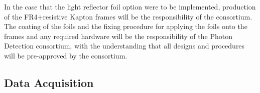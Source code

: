 In the case that the light reflector foil option were to be implemented, production of the FR4+resistive Kapton  frames will be the responsibility of the  consortium.
The  coating of the  foils and the fixing procedure for applying the  foils onto the  frames and any required hardware will be the responsibility of the Photon Detection consortium, with the understanding that all designs and procedures will be pre-approved by the  consortium. 



\subsection{Data Acquisition}
\label{sec:fdsp-pd-intfc-daq}




